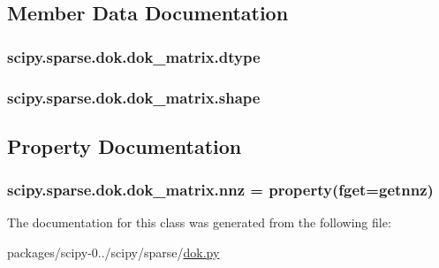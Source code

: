 \subsection{Member Data Documentation}
\hypertarget{classscipy_1_1sparse_1_1dok_1_1dok__matrix_a4b3ea9de9e442bb8debb28a065dff6ac}{}
\subsubsection[{dtype}]{\setlength{\rightskip}{0pt plus 5cm}scipy.\+sparse.\+dok.\+dok\+\_\+matrix.\+dtype}\label{classscipy_1_1sparse_1_1dok_1_1dok__matrix_a4b3ea9de9e442bb8debb28a065dff6ac}
\hypertarget{classscipy_1_1sparse_1_1dok_1_1dok__matrix_aeb70af3ad203d45144e6b7ee53fb0da7}{}
\subsubsection[{shape}]{\setlength{\rightskip}{0pt plus 5cm}scipy.\+sparse.\+dok.\+dok\+\_\+matrix.\+shape}\label{classscipy_1_1sparse_1_1dok_1_1dok__matrix_aeb70af3ad203d45144e6b7ee53fb0da7}


\subsection{Property Documentation}
\hypertarget{classscipy_1_1sparse_1_1dok_1_1dok__matrix_a4ab565e1e7a985b0a955e624fba42c85}{}
\subsubsection[{nnz}]{\setlength{\rightskip}{0pt plus 5cm}scipy.\+sparse.\+dok.\+dok\+\_\+matrix.\+nnz = property(fget={\bf getnnz})\hspace{0.3cm}{\ttfamily [static]}}\label{classscipy_1_1sparse_1_1dok_1_1dok__matrix_a4ab565e1e7a985b0a955e624fba42c85}


The documentation for this class was generated from the following file\+:\begin{DoxyCompactItemize}
\item 
packages/scipy-\/0../scipy/sparse/\hyperlink{dok_8py}{dok.\+py}\end{DoxyCompactItemize}
